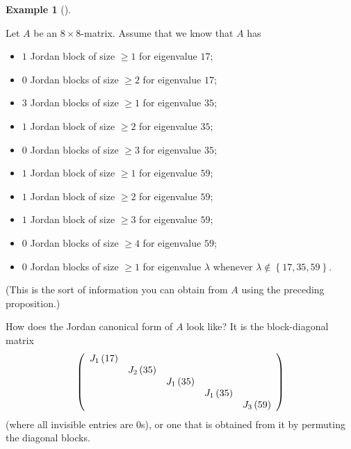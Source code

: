 \documentclass[numbers=enddot,12pt,final,onecolumn,notitlepage]{scrartcl}%
\numberwithin{exer}{subsection}
\theoremstyle{definition}
\newtheorem{exam}[theo]{Example}
\newenvironment{example}[1][]
{\begin{exam}[#1]\begin{leftbar}}
{\end{leftbar}\end{exam}}
\begin{document}
\begin{example}
Let $A$ be an $8\times8$-matrix. Assume that we know that $A$ has

\begin{itemize}
\item $1$ Jordan block of size $\geq1$ for eigenvalue $17$;

\item $0$ Jordan blocks of size $\geq2$ for eigenvalue $17$;

\item $3$ Jordan blocks of size $\geq1$ for eigenvalue $35$;

\item $1$ Jordan block of size $\geq2$ for eigenvalue $35$;

\item $0$ Jordan blocks of size $\geq3$ for eigenvalue $35$;

\item $1$ Jordan block of size $\geq1$ for eigenvalue $59$;

\item $1$ Jordan block of size $\geq2$ for eigenvalue $59$;

\item $1$ Jordan block of size $\geq3$ for eigenvalue $59$;

\item $0$ Jordan blocks of size $\geq4$ for eigenvalue $59$;

\item $0$ Jordan blocks of size $\geq1$ for eigenvalue $\lambda$ whenever
$\lambda\notin\left\{  17,35,59\right\}  $.
\end{itemize}

(This is the sort of information you can obtain from $A$ using the preceding proposition.)

How does the Jordan canonical form of $A$ look like? It is the block-diagonal
matrix%
\[
\left(
\begin{array}
[c]{ccccc}%
J_{1}\left(  17\right)   &  &  &  & \\
& J_{2}\left(  35\right)   &  &  & \\
&  & J_{1}\left(  35\right)   &  & \\
&  &  & J_{1}\left(  35\right)   & \\
&  &  &  & J_{3}\left(  59\right)
\end{array}
\right)
\]
(where all invisible entries are $0$s), or one that is obtained from it by
permuting the diagonal blocks.
\end{example}
\end{document}
